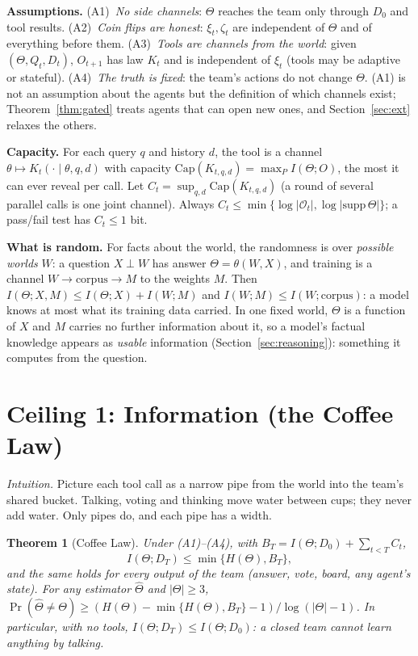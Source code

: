 \documentclass[conference]{IEEEtran}
\newtheorem{theorem}{Theorem}
\theoremstyle{definition}
\newcommand{\I}{I}
\newcommand{\Hh}{H}
\newcommand{\intuition}[1]{\noindent\textit{Intuition.} #1}
\begin{document}
\noindent\textbf{Assumptions.} (A1)~\emph{No side channels}: $\Theta$ reaches the
team only through $D_0$ and tool results. (A2)~\emph{Coin flips are honest}:
$\xi_t,\zeta_t$ are independent of $\Theta$ and of everything before them.
(A3)~\emph{Tools are channels from the world}: given $(\Theta,Q_t,D_t)$, $O_{t+1}$
has law $K_t$ and is independent of $\xi_t$ (tools may be adaptive or stateful). (A4)~\emph{The truth is
fixed}: the team's actions do not change $\Theta$. (A1) is not an assumption
about the agents but the definition of which channels exist;
Theorem~\ref{thm:gated} treats agents that can open new ones, and
Section~\ref{sec:ext} relaxes the others.

\noindent\textbf{Capacity.} For each query $q$ and history $d$, the tool is a
channel $\theta\mapsto K_t(\cdot\mid\theta,q,d)$ with capacity
$\mathrm{Cap}(K_{t,q,d})=\max_{P}\I(\Theta;O)$, the most it can ever reveal per
call. Let $C_t=\sup_{q,d}\mathrm{Cap}(K_{t,q,d})$ (a round of several parallel calls is one
joint channel). Always
$C_t\le\min\{\log|\mathcal O_t|,\log|\mathrm{supp}\,\Theta|\}$; a pass/fail test
has $C_t\le 1$ bit.

\noindent\textbf{What is random.} For facts about the world, the randomness is
over \emph{possible worlds} $W$: a question $X\perp W$ has answer
$\Theta=\theta(W,X)$, and training is a channel $W\to\text{corpus}\to M$ to the
weights $M$. Then $\I(\Theta;X,M)\le\I(\Theta;X)+\I(W;M)$ and
$\I(W;M)\le\I(W;\text{corpus})$: a model knows at most what its training data
carried. In one fixed world, $\Theta$ is a function of $X$ and $M$ carries no
further information about it, so a model's factual knowledge appears as
\emph{usable} information
(Section~\ref{sec:reasoning}): something it computes from the question.

\section{Ceiling 1: Information (the Coffee Law)}\label{sec:coffee}

\intuition{Picture each tool call as a narrow pipe from the world into the
team's shared bucket. Talking, voting and thinking move water between cups; they
never add water. Only pipes do, and each pipe has a width.}

\begin{theorem}[Coffee Law]\label{thm:coffee}
Under (A1)--(A4), with $B_T=\I(\Theta;D_0)+\sum_{t<T}C_t$,
\[
\I(\Theta;D_T)\le\min\{\Hh(\Theta),B_T\},
\]
and the same holds for every output of the team (answer, vote, board, any
agent's state). For any estimator $\hat\Theta$ and $|\Theta|\ge3$,
$\Pr(\hat\Theta\ne\Theta)\ge(\Hh(\Theta)-\min\{\Hh(\Theta),B_T\}-1)/\log(|\Theta|-1)$.
In particular, with no tools, $\I(\Theta;D_T)\le\I(\Theta;D_0)$: a closed team
cannot learn anything by talking.
\end{theorem}
\end{document}
